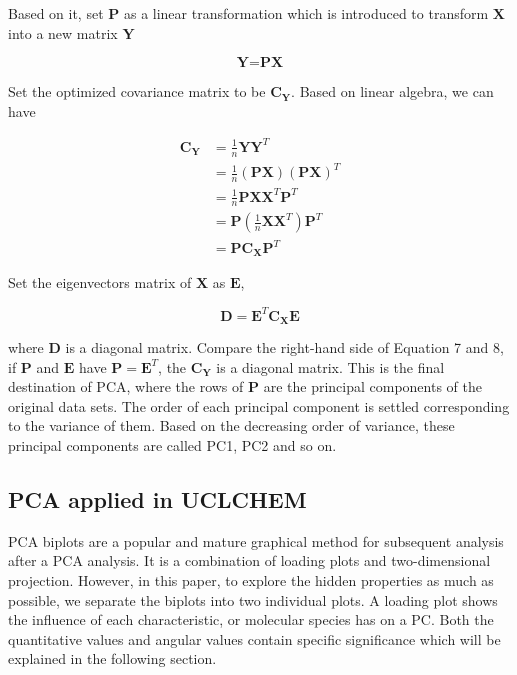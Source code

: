 \documentclass{aa}
\begin{document}
\begin{CJK*}{UTF8}{gbsn}
  Based on it, set $\textbf{P}$ as a linear transformation which is introduced to transform $\textbf{X}$ into a new matrix $\textbf{Y}$
   
   \begin{equation}
       \textbf{Y} = \textbf{P}\textbf{X}
   \end{equation}
  
  
  Set the optimized covariance matrix to be $\textbf{C}_{\textbf{Y}}$. Based on linear algebra, we can have
  
  \begin{equation}
      \begin{split}
        \textbf{C}_{\textbf{Y}}&=\frac{1}{n}\textbf{Y}\textbf{Y}^{T}\\
          &=\frac{1}{n}\left( \textbf{P}\textbf{X} \right)\left( \textbf{P}\textbf{X} \right)^{T}\\
          &=\frac{1}{n}\textbf{P}\textbf{X}\textbf{X}^{T}\textbf{P}^{T}\\
          &= \textbf{P}\left(\frac{1}{n}\textbf{X}\textbf{X}^{T} \right)\textbf{P}^{T}\\
          &= \textbf{P}\textbf{C}_{\textbf{X}}\textbf{P}^{T}
         \end{split}
  \end{equation}
  
  Set the eigenvectors matrix of $\textbf{X}$ as $\textbf{E}$, 
  
  \begin{equation}
       \textbf{D} = \textbf{E}^{T}\textbf{C}_{\textbf{X}}\textbf{E}
   \end{equation}
  
  where $\textbf{D}$ is a diagonal matrix. Compare the right-hand side of Equation 7 and 8, if $\textbf{P}$ and $\textbf{E}$ 
  have $\textbf{P}=\textbf{E}^{T}$, the $\textbf{C}_{\textbf{Y}}$ is a diagonal matrix. This is the final destination of PCA, where the rows of $\textbf{P}$ are the principal components of the original data sets. The order of each principal component is settled corresponding to the variance of them. Based on the 
  decreasing order of variance, these principal components are called PC1, PC2 and so on. 
  
 
  \subsection{PCA applied in UCLCHEM}
  
  PCA biplots are a popular and mature graphical method for subsequent analysis after a PCA analysis. 
  It is a combination of loading plots and two-dimensional projection. 
  However, in this paper, to explore the hidden properties as much as possible, we separate the biplots into two individual plots. 
  A loading plot shows the influence of each characteristic, or molecular species has on a PC. Both the quantitative values and angular values contain specific significance which will be explained in the following section. 
  

\end{CJK*}
\end{document}
